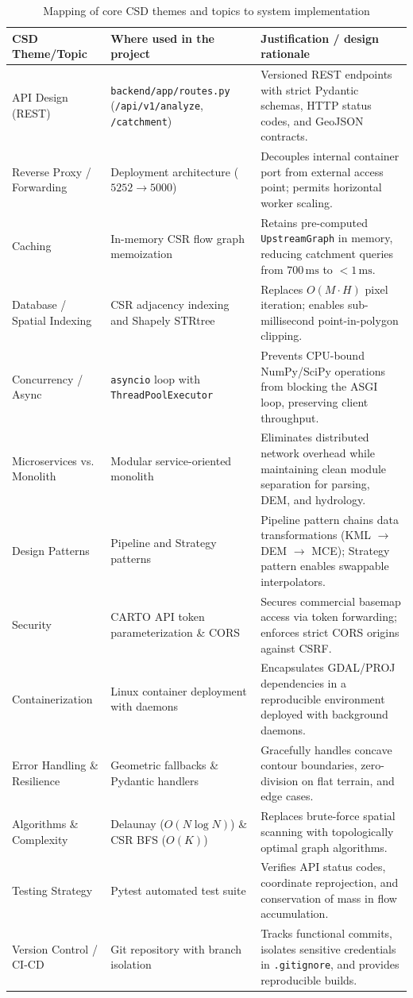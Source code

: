 \documentclass[manuscript,screen,review]{acmart}
\begin{document}
\begin{table}[t]
  \footnotesize
  \caption{Mapping of core CSD themes and topics to system implementation}
  \label{tab:csd-themes}
  \begin{tabular}{p{3.2cm}p{4.8cm}p{6.8cm}}
    \toprule
    CSD Theme/Topic & Where used in the project & Justification / design rationale \\
    \midrule
    API Design (REST) & \texttt{backend/app/routes.py} (\texttt{/api/v1/analyze}, \texttt{/catchment}) & Versioned REST endpoints with strict Pydantic schemas, HTTP status codes, and GeoJSON contracts. \\
    Reverse Proxy / Forwarding & Deployment architecture ($5252 \to 5000$) & Decouples internal container port from external access point; permits horizontal worker scaling. \\
    Caching & In-memory CSR flow graph memoization & Retains pre-computed \texttt{UpstreamGraph} in memory, reducing catchment queries from $700\,\text{ms}$ to $<1\,\text{ms}$. \\
    Database / Spatial Indexing & CSR adjacency indexing and Shapely STRtree & Replaces $O(M \cdot H)$ pixel iteration; enables sub-millisecond point-in-polygon clipping. \\
    Concurrency / Async & \texttt{asyncio} loop with \texttt{ThreadPoolExecutor} & Prevents CPU-bound NumPy/SciPy operations from blocking the ASGI loop, preserving client throughput. \\
    Microservices vs. Monolith & Modular service-oriented monolith & Eliminates distributed network overhead while maintaining clean module separation for parsing, DEM, and hydrology. \\
    Design Patterns & Pipeline and Strategy patterns & Pipeline pattern chains data transformations (KML $\to$ DEM $\to$ MCE); Strategy pattern enables swappable interpolators. \\
    Security & CARTO API token parameterization \& CORS & Secures commercial basemap access via token forwarding; enforces strict CORS origins against CSRF. \\
    Containerization & Linux container deployment with daemons & Encapsulates GDAL/PROJ dependencies in a reproducible environment deployed with background daemons. \\
    Error Handling \& Resilience & Geometric fallbacks \& Pydantic handlers & Gracefully handles concave contour boundaries, zero-division on flat terrain, and edge cases. \\
    Algorithms \& Complexity & Delaunay ($O(N\log N)$) \& CSR BFS ($O(K)$) & Replaces brute-force spatial scanning with topologically optimal graph algorithms. \\
    Testing Strategy & Pytest automated test suite & Verifies API status codes, coordinate reprojection, and conservation of mass in flow accumulation. \\
    Version Control / CI-CD & Git repository with branch isolation & Tracks functional commits, isolates sensitive credentials in \texttt{.gitignore}, and provides reproducible builds. \\
    \bottomrule
  \end{tabular}
\end{table}
\end{document}
